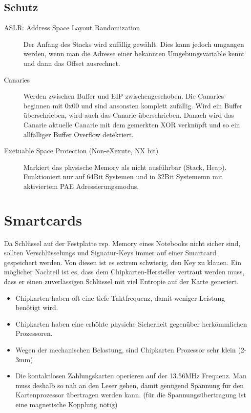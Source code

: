\subsection{Schutz}
\begin{description}
	\item[ASLR: Address Space Layout Randomization] Der Anfang des Stacks wird zufällig gewählt. Dies kann jedoch umgangen werden, wenn man die Adresse einer bekannten Umgebungsvariable kennt und dann das Offset ausrechnet.
	\item[Canaries] Werden zwischen Buffer und EIP zwischengeschoben. Die Canaries beginnen mit 0x00 und sind ansonsten komplett zufällig. Wird ein Buffer überschrieben, wird auch das Canarie überschrieben. Danach wird das Canarie aktuelle Canarie mit dem gemerkten XOR verknüpft und so ein allfälliger Buffer Overflow detektiert.
	\item[Exetuable Space Protection (Non-eXexute, NX bit)] Markiert das physische Memory als nicht ausführbar (Stack, Heap). Funktioniert nur auf 64Bit Systemen und in 32Bit Systememn mit aktiviertem PAE Adressierungsmodus.
\end{description}

\section{Smartcards}
Da Schlüssel auf der Festplatte rsp. Memory eines Notebooks nicht sicher sind, sollten Verschlüsselungs und Signatur-Keys immer auf einer Smartcard gespeichert werden. Von diesen ist es extrem schwierig, den Key zu klauen. Ein möglicher Nachteil ist es, dass dem Chipkarten-Hersteller vertraut werden muss, dass er einen zuverlässigen Schlüssel mit viel Entropie auf der Karte generiert.

\begin{itemize}
	\item Chipkarten haben oft eine tiefe Taktfrequenz, damit weniger Leistung benötigt wird.
	\item Chipkarten haben eine erhöhte physiche Sicherheit gegenüber herkömmlichen Prozessoren.
	\item Wegen der mechanischen Belastung, sind Chipkarten Prozessor sehr klein (2-3mm)
	\item Die kontaktlosen Zahlungskarten operieren auf der 13.56MHz Frequenz. Man muss deshalb so nah an den Leser gehen, damit genügend Spannung für den Kartenprozessor übertragen werden kann. (für die Spannungsübertragung ist eine magnetische Kopplung nötig)
\end{itemize}

